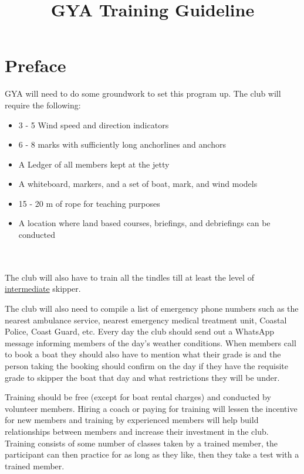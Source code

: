 \documentclass[12pt]{scrartcl}
\title{GYA Training Guideline}
\date{}
\begin{document}
\maketitle

\thispagestyle{empty}

\tableofcontents

\newpage

\section{Preface} \label{sec:preface}

GYA will need to do some groundwork to set this program up. The club will require the following:

\label{list:club requirements}
\begin{itemize}
	\item 3 - 5 Wind speed and direction indicators
	\item 6 - 8 marks with sufficiently long anchorlines and anchors
	\item A Ledger of all members kept at the jetty
	\item A whiteboard, markers, and a set of boat, mark, and wind models
	\item 15 - 20 m of rope for teaching purposes
	\item A location where land based courses, briefings, and debriefings can be conducted
\end{itemize}
\\
\\
The club will also have to train all the tindles till at least the level of \hyperlink{grade:intermediate}{intermediate} skipper.

The club will also need to compile a list of emergency phone numbers such as the nearest ambulance service, nearest emergency medical treatment unit, Coastal Police, Coast Guard, etc. Every day the club should send out a WhatsApp message informing members of the day’s weather conditions. When members call to book a boat they should also have to mention what their grade is and the person taking the booking should confirm on the day if they have the requisite grade to skipper the boat that day and what restrictions they will be under.

Training should be free (except for boat rental charges) and conducted by volunteer members. Hiring a coach or paying for training will lessen the incentive for new members and training by experienced members will help build relationships between members and increase their investment in the club. Training consists of some number of classes taken by a trained member, the participant can then practice for as long as they like, then they take a test with a trained member.
\end{document}
